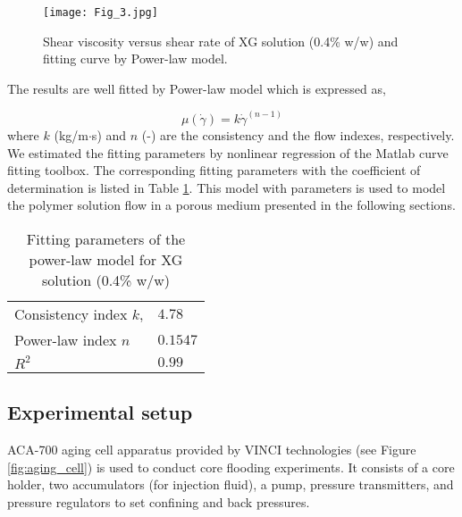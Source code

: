 \documentclass{article}
\begin{document}
\begin{figure}[H]
\begin{centering}
\texttt{[image: Fig\_3.jpg]}
\par\end{centering}
\caption{Shear viscosity versus shear rate of XG solution (0.4\% w/w) and fitting curve by Power-law model.\label{fig:XG}}
\end{figure}


The results are well fitted by Power-law model which is expressed as, 

\begin{equation}
\mu (\dot{\gamma}) = k\dot{\gamma}^{(n-1)} \label{eq:power-law}
\end{equation}
where $k$ (kg/m$\cdot$s) and $n$ (-) are the consistency and the flow indexes, respectively. We estimated the fitting parameters by nonlinear regression of the Matlab curve fitting toolbox.
The corresponding fitting parameters with the coefficient of determination is listed in Table \ref{tab:PL_param}. This model with parameters is used to model the polymer solution flow in a porous medium presented in the following sections.

\begin{table}[H]
\fontsize{10}{12}\selectfont \caption{Fitting parameters of the power-law model for XG solution (0.4\% w/w)}
\begin{centering}
    \begin{tabular}{ p{8cm} p{2cm}}
\toprule 
 Consistency index $k$,                               & $4.78$ \\
 Power-law index $n$                                  & $0.1547$ \\
 $R^2$                                                & $0.99$\\
\bottomrule
\end{tabular}
  \label{tab:PL_param}
\par\end{centering}
\end{table}

\subsection{Experimental setup}
ACA-700 aging cell apparatus provided by VINCI technologies (see Figure \ref{fig:aging_cell}) is used to conduct core flooding experiments. It consists of a core holder, two accumulators (for injection fluid), a pump, pressure transmitters, and pressure regulators to set confining and back pressures. 
\end{document}

